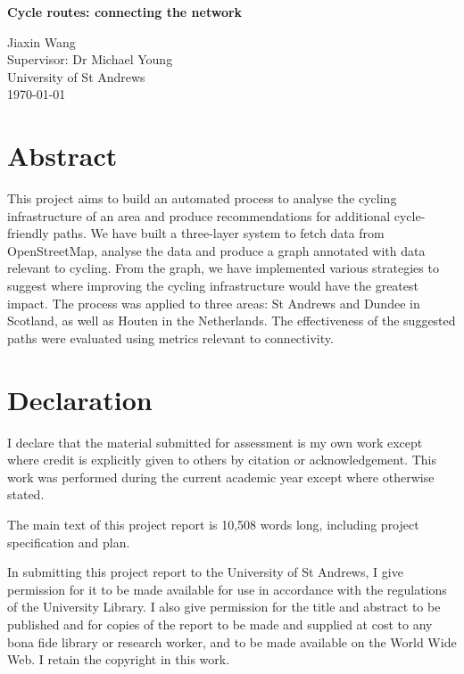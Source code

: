 \documentclass[12pt,a4paper]{report}
\begin{document}
\pagestyle{empty}

\vspace*{60mm}
\begin{center}
\Huge
\textbf{Cycle routes: connecting the network}

\vfill
\large
Jiaxin Wang \\[3mm]
Supervisor: Dr Michael Young \\[3mm]
University of St Andrews \\[3mm]
\today  %
\end{center}
\thispagestyle{empty}

\pagestyle{plain}
\chapter*{Abstract}
This project aims to build an automated process to analyse the cycling infrastructure of an area and produce recommendations for additional cycle-friendly paths. We have built a three-layer system to fetch data from OpenStreetMap, analyse the data and produce a graph annotated with data relevant to cycling. From the graph, we have implemented various strategies to suggest where improving the cycling infrastructure would have the greatest impact. The process was applied to three areas: St Andrews and Dundee in Scotland, as well as Houten in the Netherlands. The effectiveness of the suggested paths were evaluated using metrics relevant to connectivity.

\chapter*{Declaration}
I declare that the material submitted for assessment is my own work except where credit is explicitly given to others by citation or acknowledgement. This work was performed during the current academic year except where otherwise stated.

The main text of this project report is 10,508 words long, including project specification and plan.

In submitting this project report to the University of St Andrews, I give permission for it to be made available for use in accordance with the regulations of the University Library. I also give permission for the title and abstract to be published and for copies of the report to be made and supplied at cost to any bona fide library or research worker, and to be made available on the World Wide Web. I retain the copyright in this work.
\end{document}
